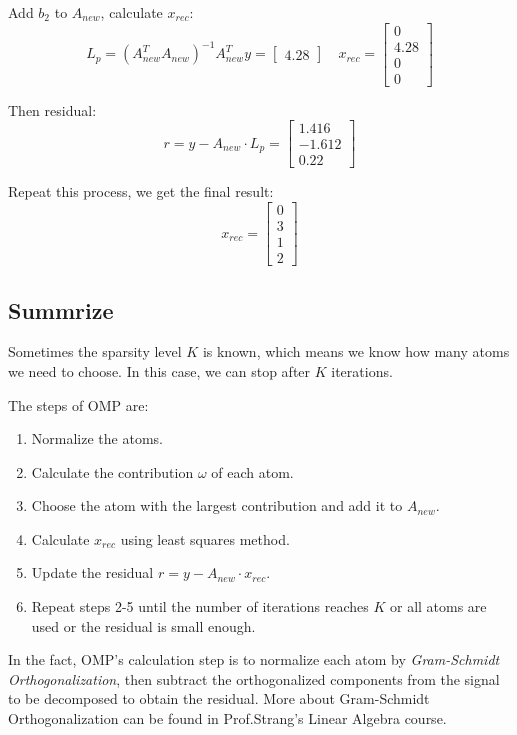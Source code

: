 \documentclass[10pt,a4paper,oneside,numbers=noenddot]{scrbook}
\theoremstyle{ctplain}
\theoremstyle{ctresult}
\begin{document}
Add $b_2$ to $A_{new}$, calculate $x_{rec}$:
\[
  L_p = (A_{new}^TA_{new})^{-1}A_{new}^Ty = \begin{bmatrix} 4.28 \end{bmatrix} \quad
  x_{rec} = \begin{bmatrix} 0 \\ 4.28 \\ 0 \\ 0 \end{bmatrix}
\]

Then residual:
\[
  r = y - A_{new} \cdot L_p = \begin{bmatrix} 1.416 \\ -1.612 \\ 0.22 \end{bmatrix}
\]

Repeat this process, we get the final result:
\[
  x_{rec} = \begin{bmatrix} 0 \\ 3 \\ 1 \\ 2 \end{bmatrix}
\]

\subsection{Summrize}

Sometimes the sparsity level $K$ is known, which means we know how many atoms we need
to choose. In this case, we can stop after $K$ iterations.

The steps of OMP are:
\begin{enumerate}
  \item Normalize the atoms.
  \item Calculate the contribution $\omega$ of each atom.
  \item Choose the atom with the largest contribution and add it to $A_{new}$.
  \item Calculate $x_{rec}$ using least squares method.
  \item Update the residual $r = y - A_{new} \cdot x_{rec}$.
  \item Repeat steps 2-5 until the number of iterations reaches $K$ or all atoms are
  used or the residual is small enough.
\end{enumerate}

In the fact, OMP's calculation step is to normalize each atom by \emph{Gram-Schmidt
Orthogonalization}, then subtract the orthogonalized components from the signal to be
decomposed to obtain the residual. More about Gram-Schmidt Orthogonalization
can be found in Prof.Strang's Linear Algebra course.
\end{document}

